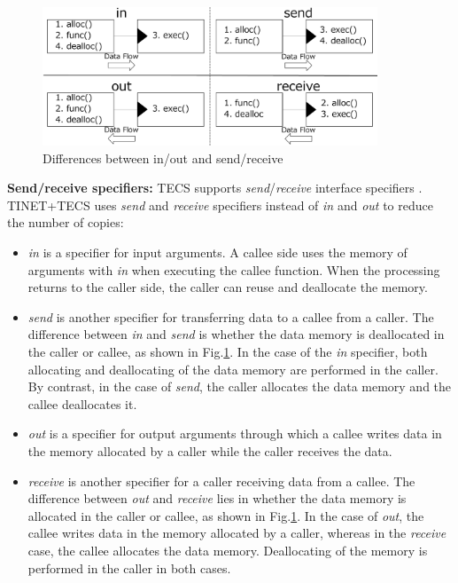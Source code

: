 \documentclass[a4j,12pt,oneside,openany,english]{jsbook}
\begin{document}
\begin{figure}[t]
    \centering
    \includegraphics[width=10cm,clip]{figure/SendReceive.pdf}
    \caption{Differences between in/out and send/receive}
    \label{fig:SendReceive}
\end{figure}

{\bf Send/receive specifiers:}
TECS supports {\it send}/{\it receive} interface specifiers \cite{par:RPC}.
TINET+TECS uses {\it send} and {\it receive} specifiers instead of {\it in} and {\it out} to reduce the number of copies:

\begin{itemize}
\item {\it in} is a specifier for input arguments.
A callee side uses the memory of arguments with {\it in} when executing the callee function.
When the processing returns to the caller side, the caller can reuse and deallocate the memory.

\item {\it send} is another specifier for transferring data to a callee from a caller.
The difference between {\it in} and {\it send} is whether the data memory is deallocated in the caller or callee, as shown in Fig.\ref{fig:SendReceive}.
In the case of the {\it in} specifier, both allocating and deallocating of the data memory are performed in the caller.
By contrast, in the case of {\it send}, the caller allocates the data memory and the callee deallocates it.

\item {\it out} is a specifier for output arguments through which a callee writes data in the memory allocated by a caller while the caller receives the data.

\item {\it receive} is another specifier for a caller receiving data from a callee.
The difference between {\it out} and {\it receive} lies in whether the data memory is allocated in the caller or callee, as shown in Fig.\ref{fig:SendReceive}.
In the case of {\it out}, the callee writes data in the memory allocated by a caller, whereas in the {\it receive} case, the callee allocates the data memory.
Deallocating of the memory is performed in the caller in both cases.
\end{itemize}
\end{document}
